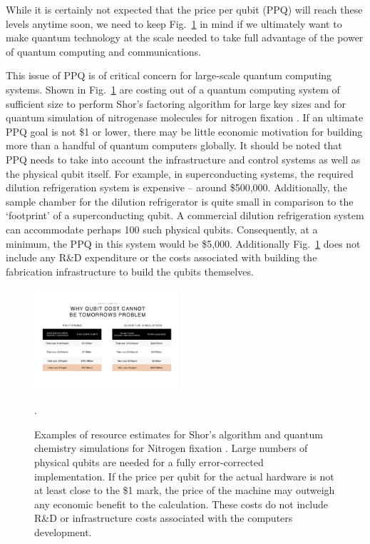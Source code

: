 \documentclass[twocolumn, aps, rmp, amsmath, amssymb, nofootinbib, superscriptaddress, longbibliography, floatfix, table-of-contents, eqsecnum]{revtex4-2}
\begin{document}
While it is certainly not expected that the price per qubit (PPQ) will reach these levels anytime soon, we need to keep Fig.~\ref{fig:price} in mind if we ultimately want to make quantum technology at the scale needed to take full advantage of the power of quantum computing and communications. 

This issue of PPQ is of critical concern for large-scale quantum computing systems. Shown in Fig.~\ref{fig:price} are costing out of a quantum computing system of sufficient size to perform Shor's factoring algorithm for large key sizes and for quantum simulation of nitrogenase molecules for nitrogen fixation \cite{SD-Fowler:2012aa, SD-Reiher:2017aa}. If an ultimate PPQ goal is not \$1 or lower, there may be little economic motivation for building more than a handful of quantum computers globally. It should be noted that PPQ needs to take into account the infrastructure and control systems as well as the physical qubit itself. For example, in superconducting systems, the required dilution refrigeration system is expensive -- around \$500,000. Additionally, the sample chamber for the dilution refrigerator is quite small in comparison to the `footprint' of a superconducting qubit. A commercial dilution refrigeration system can accommodate perhaps 100 such physical qubits. Consequently, at a minimum, the PPQ in this system would be \$5,000. Additionally Fig.~\ref{fig:price} does not include any R\&D expenditure or the costs associated with building the fabrication infrastructure to build the qubits themselves. 

\begin{figure}[htbp!]
	\includegraphics[clip=true, width=0.475\textwidth]{PPQ}
	\caption{Examples of resource estimates for Shor's algorithm \cite{SD-Fowler:2012aa} and quantum chemistry simulations for Nitrogen fixation \cite{SD-Reiher:2017aa}. Large numbers of physical qubits are needed for a fully error-corrected implementation. If the price per qubit for the actual hardware is not at least close to the \$1 mark, the price of the machine may outweigh any economic benefit to the calculation. These costs do not include R\&D or infrastructure costs associated with the computers development.} \label{fig:price}.
\end{figure}
\end{document}
